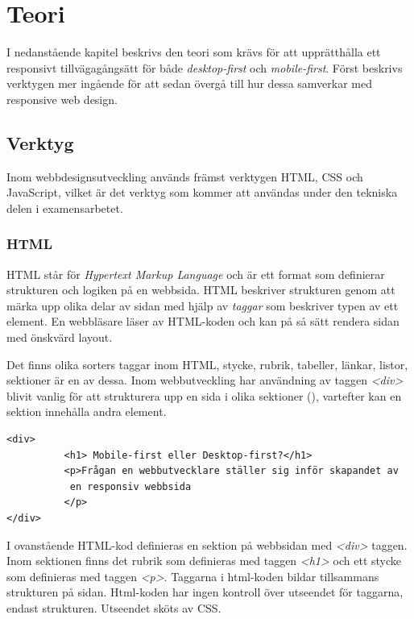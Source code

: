 \documentclass[11pt]{article}
\begin{document}
\section{Teori}
I nedanstående kapitel beskrivs den teori som krävs för att upprätthålla ett responsivt tillvägagångsätt för både \textit{desktop-first} och \textit{mobile-first}. Först beskrivs verktygen mer ingående för att sedan övergå till hur dessa samverkar med responsive web design.

\subsection{Verktyg}

Inom webbdesignsutveckling används främst verktygen HTML, CSS och JavaScript, vilket är det verktyg som kommer att användas under den tekniska delen i examensarbetet.

\subsubsection{HTML}
HTML står för \textit{Hypertext Markup Language} och är ett format som definierar strukturen och logiken på en webbsida. HTML beskriver strukturen genom att märka upp olika delar av sidan med hjälp av \textit{taggar} som beskriver typen av ett element. En webbläsare läser av HTML-koden och kan på så sätt rendera sidan med önskvärd layout.

Det finns olika sorters taggar inom HTML, stycke, rubrik, tabeller, länkar, listor, sektioner är en av dessa. Inom webbutveckling har användning av taggen \textit{<div>} blivit vanlig för att strukturera upp en sida i olika sektioner (\cite{divtable}), vartefter kan en sektion innehålla andra element.

\vspace{0.3cm}
\begin{verbatim}
<div> 
          <h1> Mobile-first eller Desktop-first?</h1>
          <p>Frågan en webbutvecklare ställer sig inför skapandet av
           en responsiv webbsida
          </p>
</div>
\end{verbatim}
\vspace{0.3cm}

I ovanstående HTML-kod definieras en sektion på webbsidan med \textit{<div>} taggen. Inom sektionen finns det rubrik som definieras med taggen \textit{<h1>} och ett stycke som definieras med taggen \textit{<p>}. Taggarna i html-koden bildar tillsammans strukturen på sidan. Html-koden har ingen kontroll över utseendet för taggarna, endast strukturen. Utseendet sköts av CSS.
\end{document}
